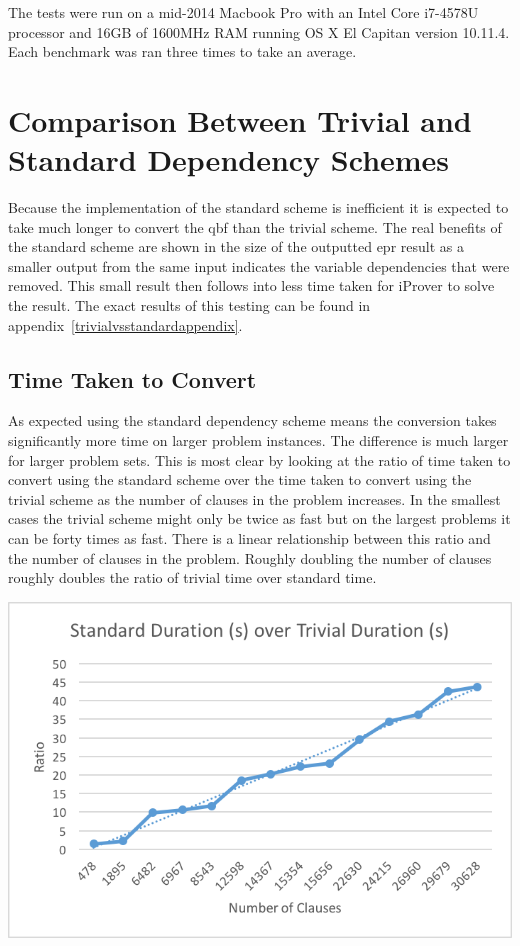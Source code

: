 The tests were run on a mid-2014 Macbook Pro with an Intel Core i7-4578U processor and 16GB of 1600MHz RAM running OS X El Capitan version 10.11.4. Each benchmark was ran three times to take an average.

\section{Comparison Between Trivial and Standard Dependency Schemes} \label{trivialvsstd}
Because the implementation of the standard scheme is inefficient it is expected to take much longer to convert the \gls{qbf} than the trivial scheme. The real benefits of the standard scheme are shown in the size of the outputted \gls{epr} result as a smaller output from the same input indicates the variable dependencies that were removed. This small result then follows into less time taken for iProver to solve the result. The exact results of this testing can be found in appendix~\ref{trivialvsstandardappendix}.

\subsection{Time Taken to Convert}
As expected using the standard dependency scheme means the conversion takes significantly more time on larger problem instances. The difference is much larger for larger problem sets. This is most clear by looking at the ratio of time taken to convert using the standard scheme over the time taken to convert using the trivial scheme as the number of clauses in the problem increases. In the smallest cases the trivial scheme might only be twice as fast but on the largest problems it can be forty times as fast. There is a linear relationship between this ratio and the number of clauses in the problem. Roughly doubling the number of clauses roughly doubles the ratio of trivial time over standard time.

\begin{center}
\includegraphics{standarddurationovertrivialduration.png}
\end{center}

